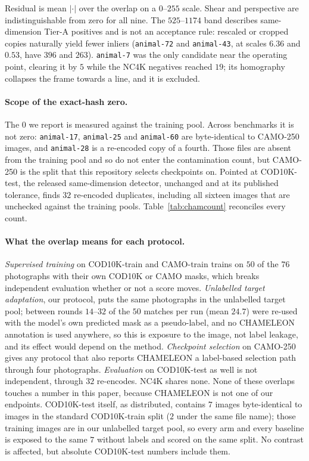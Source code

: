 \documentclass{article}
\newif\ifrevmarked \revmarkedtrue
\DeclareRobustCommand{\revC}[1]{\ifrevmarked{\color{RevC}#1}\else{#1}\fi}
\newenvironment{revblock}[1]{\ifrevmarked\color{#1}\fi}{}
\begin{document}
Residual is mean $|{\cdot}|$ over the overlap on a $0$--$255$ scale. Shear and perspective are
indistinguishable from zero for all nine. The $525$--$1174$ band describes same-dimension Tier-A
positives and is not an acceptance rule: rescaled or cropped copies naturally yield fewer inliers
(\texttt{animal-72} and \texttt{animal-43}, at scales $6.36$ and $0.53$, have $396$ and $263$).
\texttt{animal-7} was the only candidate near the operating point, clearing it by $5$ while the NC4K
negatives reached $19$; its homography collapses the frame towards a line, and it is excluded.

\paragraph{Scope of the exact-hash zero.} The $0$ we report is measured against the training pool.
Across benchmarks it is not zero: \texttt{animal-17}, \texttt{animal-25} and \texttt{animal-60} are
byte-identical to CAMO-250 images\revC{, and \texttt{animal-28} is a re-encoded copy of a fourth}. Those files are absent from the training pool and so do not enter
the contamination count, but CAMO-250 is the split that this repository selects checkpoints on.
\revC{Pointed at COD10K-test, the released same-dimension detector, unchanged and at its published tolerance, finds
$32$ re-encoded duplicates, including all sixteen images that are unchecked against the training pools.
Table~\ref{tab:chamcount} reconciles every count.}



\begin{revblock}{RevC}
\paragraph{What the overlap means for each protocol.} \emph{Supervised training} on COD10K-train and CAMO-train trains on
$50$ of the $76$ photographs with their own COD10K or CAMO masks, which breaks independent evaluation whether or not a
score moves. \emph{Unlabelled target adaptation}, our protocol, puts the same photographs in the unlabelled target pool;
between rounds $14$--$32$ of the $50$ matches per run (mean $24.7$) were re-used with the model's own predicted
mask as a pseudo-label, and no CHAMELEON annotation is used anywhere, so this is exposure to the image, not label
leakage, and its effect would depend on the method. \emph{Checkpoint selection} on CAMO-250 gives any protocol that also
reports CHAMELEON a label-based selection path through four photographs. \emph{Evaluation} on COD10K-test as well is
not independent, through $32$ re-encodes. NC4K shares none. None of these overlaps touches a number in this paper,
because CHAMELEON is not one of our endpoints. COD10K-test itself, as distributed, contains $7$ images byte-identical to
images in the standard COD10K-train split ($2$ under the same file name); those training images are in our unlabelled
target pool, so every arm and every baseline is exposed to the same $7$ without labels and scored on the same split. No
contrast is affected, but absolute COD10K-test numbers include them.
\end{revblock}
\end{document}
